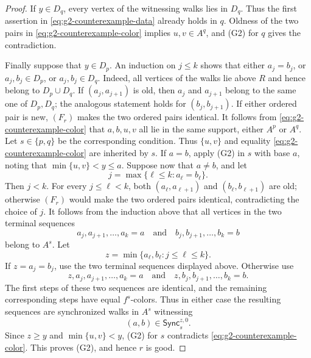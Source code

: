 \documentclass{amsart}
\numberwithin{equation}{section}
\theoremstyle{definition}
\theoremstyle{remark}
\begin{document}
\begin{proof}
If $y\in D_q$, every vertex of the witnessing walks lies in $D_q$.
Thus the first assertion in \eqref{eq:g2-counterexample-data} already
holds in $q$.  Oldness of the two pairs in
\eqref{eq:g2-counterexample-color} implies $u,v\in A^q$, and (G2) for
$q$ gives the
contradiction.

Finally suppose that $y\in D_p$.  An induction on $j\leq k$ shows that
either $a_j=b_j$, or $a_j,b_j\in D_p$, or $a_j,b_j\in D_q$.  Indeed,
all vertices of the walks lie above $R$ and hence belong to
$D_p\cup D_q$.  If $(a_j,a_{j+1})$ is old, then $a_j$ and $a_{j+1}$
belong to the same one of $D_p,D_q$; the analogous statement holds for
$(b_j,b_{j+1})$.  If either ordered pair is new, $(F_r)$ makes the two
ordered pairs identical.  It follows from
\eqref{eq:g2-counterexample-color} that
$a,b,u,v$ all lie in the same
support, either $A^p$ or $A^q$.  Let $s\in\{p,q\}$ be the corresponding
condition.  Thus $\{u,v\}$ and equality
\eqref{eq:g2-counterexample-color} are inherited by $s$.
If $a=b$, apply (G2) in $s$
with base $a$, noting that $\min\{u,v\}<y\leq a$.  Suppose now that
$a\ne b$, and let
\begin{displaymath}
 j=\max\{\ell\leq k:a_\ell=b_\ell\}.
\end{displaymath}
Then $j<k$.  For every $j\leq\ell<k$, both
$(a_\ell,a_{\ell+1})$ and $(b_\ell,b_{\ell+1})$ are old; otherwise
$(F_r)$ would make the two ordered pairs identical, contradicting the
choice of $j$.  It follows from the induction above that all vertices
in the two terminal sequences
\begin{displaymath}
 a_j,a_{j+1},\ldots,a_k=a
 \quad\text{and}\quad
 b_j,b_{j+1},\ldots,b_k=b
\end{displaymath}
belong to $A^s$.  Let
\begin{displaymath}
 z=\min\{a_\ell,b_\ell:j\leq\ell\leq k\}.
\end{displaymath}
If $z=a_j=b_j$, use the two terminal sequences displayed above.
Otherwise use
\begin{displaymath}
 z,a_j,a_{j+1},\ldots,a_k=a
 \quad\text{and}\quad
 z,b_j,b_{j+1},\ldots,b_k=b.
\end{displaymath}
The first steps of these two sequences are identical, and the remaining
corresponding steps have equal $f^s$-colors.  Thus in either case the
resulting sequences are synchronized walks in $A^s$ witnessing
\begin{displaymath}
 (a,b)\in\mathsf{Sync}^{z,0}_s.
\end{displaymath}
Since $z\geq y$ and $\min\{u,v\}<y$, (G2) for $s$ contradicts
\eqref{eq:g2-counterexample-color}.  This proves (G2), and hence $r$
is good.
\end{proof}
\end{document}
